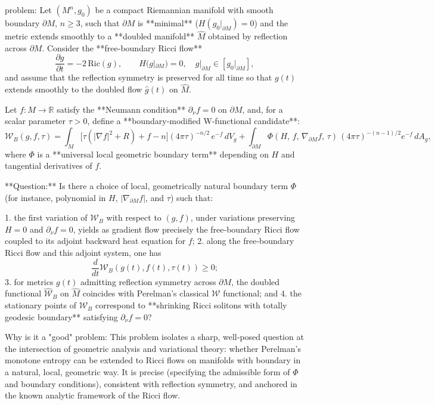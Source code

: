 problem:  
Let \( (M^n, g_0) \) be a compact Riemannian manifold with smooth boundary \( \partial M \), \( n \ge 3 \), such that \( \partial M \) is **minimal** (\(H(g_0|_{\partial M})=0\)) and the metric extends smoothly to a **doubled manifold** \( \hat M \) obtained by reflection across \( \partial M \).  
Consider the **free‑boundary Ricci flow**  
\[
\frac{\partial g}{\partial t} = -2\,\mathrm{Ric}(g), \qquad H(g|_{\partial M})=0,\quad g|_{\partial M}\in [g_0|_{\partial M}],
\]
and assume that the reflection symmetry is preserved for all time so that \(g(t)\) extends smoothly to the doubled flow \( \hat g(t) \) on \( \hat M \).

Let \( f:M\to\mathbb R \) satisfy the **Neumann condition** \( \partial_\nu f = 0\) on \(\partial M\), and, for a scalar parameter \(\tau>0\), define a **boundary‑modified W‑functional candidate**:
\[
\mathcal W_B(g,f,\tau)
 = \int_M \Big[\tau(|\nabla f|^2 + R)
      + f - n \Big](4\pi\tau)^{-n/2}\,e^{-f}\,dV_g
   + \int_{\partial M}
       \Phi(H,\,f,\,\nabla_{\!\partial M} f,\,\tau)\,(4\pi\tau)^{-(n-1)/2}e^{-f}\,dA_g,
\]
where \(\Phi\) is a **universal local geometric boundary term** depending on \(H\) and tangential derivatives of \(f\).

**Question:**  
Is there a choice of local, geometrically natural boundary term \(\Phi\) (for instance, polynomial in \(H\), \(|\nabla_{\!\partial M}f|\), and \(\tau\)) such that:

1. the first variation of \(\mathcal W_B\) with respect to \((g,f)\), under variations preserving \(H=0\) and \(\partial_\nu f=0\), yields as gradient flow precisely the free‑boundary Ricci flow coupled to its adjoint backward heat equation for \(f\);  
2. along the free‑boundary Ricci flow and this adjoint system, one has
   \[
   \frac{d}{dt}\mathcal W_B(g(t),f(t),\tau(t))\ge 0;
   \]
3. for metrics \(g(t)\) admitting reflection symmetry across \(\partial M\), the doubled functional \(\hat{\mathcal W}_B\) on \(\hat M\) coincides with Perelman’s classical \(\mathcal W\) functional; and  
4. the stationary points of \(\mathcal W_B\) correspond to **shrinking Ricci solitons with totally geodesic boundary** satisfying \(\partial_\nu f=0\)?

Why is it a "good" problem:  
This problem isolates a sharp, well‑posed question at the intersection of geometric analysis and variational theory: whether Perelman’s monotone entropy can be extended to Ricci flows on manifolds with boundary in a natural, local, geometric way.  It is precise (specifying the admissible form of \(\Phi\) and boundary conditions), consistent with reflection symmetry, and anchored in the known analytic framework of the Ricci flow.  

